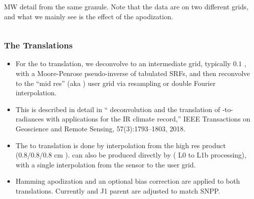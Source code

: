 \documentclass[9pt]{beamer}
\begin{document}
\begin{frame}
\begin{columns}[t]
\begin{column}{0.5\textwidth}
MW detail from the same granule.  Note that the data are on two
different grids, and what we mainly see is the effect of the {\chirp}
apodization.

\end{column}
\end{columns}
\end{frame}
\begin{frame}
\frametitle{The Translations}

\begin{itemize}

  \item For the {\airs} to {\chirp} translation, we deconvolve
    {\airs} to an intermediate grid, typically $0.1$ {\wn}, with a
    Moore-Penrose pseudo-inverse of tabulated {\airs} SRFs, and then
    reconvolve to the {\cris} ``mid res'' (aka \chirp) user grid via
    resampling or double Fourier interpolation.

  \item This is described in detail in ``{\airs} deconvolution and
    the translation of {\airs}-to-{\cris} radiances with applications
    for the IR climate record,'' IEEE Transactions on Geoscience and
    Remote Sensing, 57(3):1793--1803, 2018.

  \item The {\cris} to {\chirp} translation is done by interpolation
    from the {\cris} high res product (0.8/0.8/0.8 cm \opd).  {\chirp}
    can also be produced directly by {\umbc} {\ccast} ({\cris} L0 to
    L1b processing), with a single interpolation from the sensor to
    the {\chirp} user grid.

  \item Hamming apodization and an optional bias correction are
    applied to both translations.  Currently {\airs} and {\cris} J1
    parent are adjusted to match {\cris} SNPP.

\end{itemize}
\end{frame}
\end{document}
